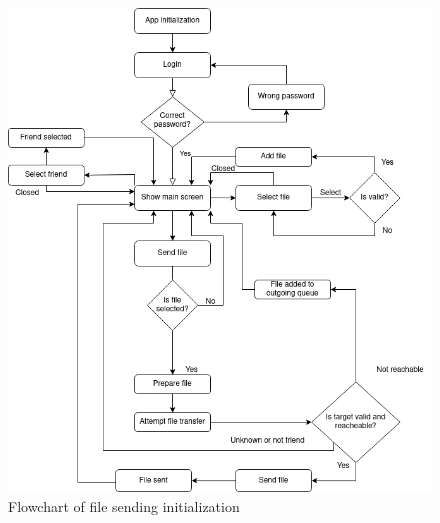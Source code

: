 \begin{figure}[ht]
    \centering
    \includegraphics[scale = 0.5]{images/filesending.png}
    \caption{Flowchart of file sending initialization}
    \label{fig:flowchart}
\end{figure}
